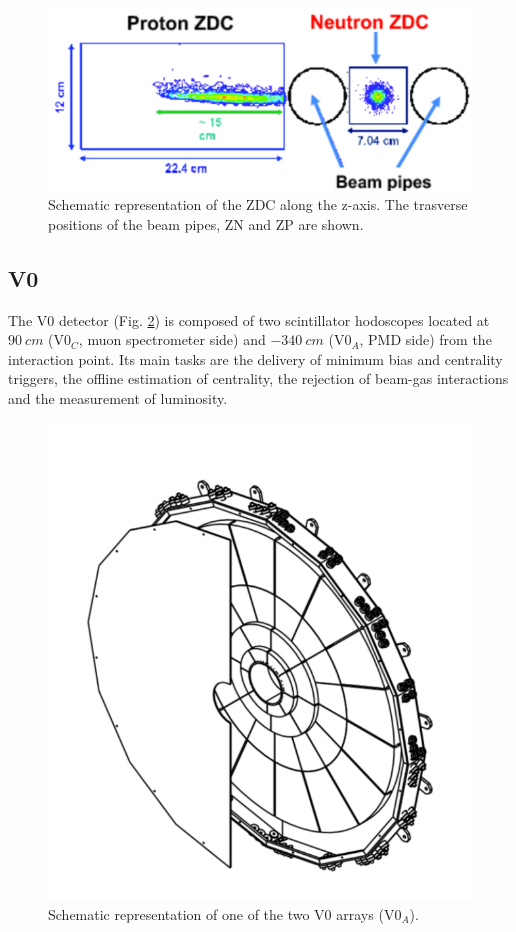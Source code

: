 \begin{figure}[!h]
\begin{center}
\includegraphics[width=.5\linewidth]{Chapters/Introduction/Figs/ZDC.pdf}
\caption{Schematic representation of the ZDC along the z-axis. The trasverse positions of the beam pipes, ZN and ZP are shown.}
\label{fig:ZDC}
\end{center}
\end{figure}

\subsection{V0}
The V0 detector (Fig. \ref{fig:V0}) is composed of two scintillator hodoscopes located at $90\ cm$ (V0$_C$, muon spectrometer side) and $-340\ cm$ (V0$_A$, PMD side) from the interaction point. 
Its main tasks are the delivery of minimum bias and centrality triggers, the offline estimation of centrality, the rejection of beam-gas interactions and the measurement of luminosity.

\begin{figure}[!h]
\begin{center}
\includegraphics[width=.7\linewidth]{Chapters/Introduction/Figs/V0.pdf}
\caption{Schematic representation of one of the two V0 arrays (V0$_A$).}
\label{fig:V0}
\end{center}
\end{figure}

